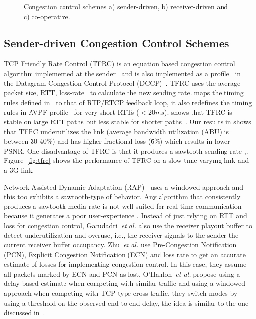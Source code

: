 \begin{figure}
  \centerline{
  }
  \centerline{
  }
  \centerline{
  }
  \caption{Congestion control schemes a) sender-driven, b) receiver-driven
and c) co-operative.}
  \label{fig:cc:scheme}
\end{figure}


\subsection{Sender-driven Congestion Control Schemes}

TCP Friendly Rate Control (TFRC) is an equation based congestion control
algorithm implemented at the sender~\cite{tfrc_347397} and is also implemented
as a profile~\cite{rfc4342} in the Datagram Congestion Control Protocol
(DCCP)~\cite{rfc4340}. TFRC uses the average packet size, RTT,
loss-rate~\cite{rfc3448} to calculate the new sending rate.
\cite{draft.rtp.tfrc} maps the timing rules defined in~\cite{rfc4828, rfc5348}
to that of RTP/RTCP feedback loop, it also redefines the timing rules in
AVPF-profile~\cite{rfc4585} for very short RTTs ($<20ms$).
\cite{Gharai06:ICME} shows that TFRC is stable on large RTT paths but less
stable for shorter paths~\cite{saurin:2006:thesis}. Our results in
 shows that TFRC underutilizes the link (average bandwidth
utilization (ABU) is between 30-40\%) and has higher fractional loss (\~6\%)
which results in lower PSNR. One disadvantage of TFRC is that it produces a
sawtooth sending rate \cite{saurin:2006:thesis},.
Figure~\ref{fig:tfrc} shows the performance of TFRC on a slow time-varying
link and a 3G link.

Network-Assisted Dynamic Adaptation (RAP)~\cite{rap:752152} uses a
windowed-approach and this too exhibits a sawtooth-type of behavior. Any
algorithm that consistently produces a sawtooth media rate is not well suited
for real-time communication because it generates a poor user-experience
\cite{Gharai:2002wt,VladBalan:2007dq, Zink03subjectiveimpression}. Instead of
just relying on RTT and loss for congestion control, Garudadri~\textit{et
al.}\cite{4397059} also use the receiver playout buffer to detect
underutilization and overuse, i.e., the receiver signals to the sender the
current receiver buffer occupancy. Zhu~\textit{et al.}\cite{rmcat-nada} use
Pre-Congestion Notification (PCN), Explicit Congestion Notification (ECN) and
loss rate to get an accurate estimate of losses for implementing congestion
control. In this case, they assume all packets marked by ECN and PCN as lost.
O'Hanlon~\textit{et al.}\cite{rmcat-dflow} propose using a delay-based
estimate when competing with similar traffic and using a windowed-approach
when competing with TCP-type cross traffic, they switch modes by using a
threshold on the observed end-to-end delay, the idea is similar to the one
discussed in~\cite{budzisz2011fair}.

